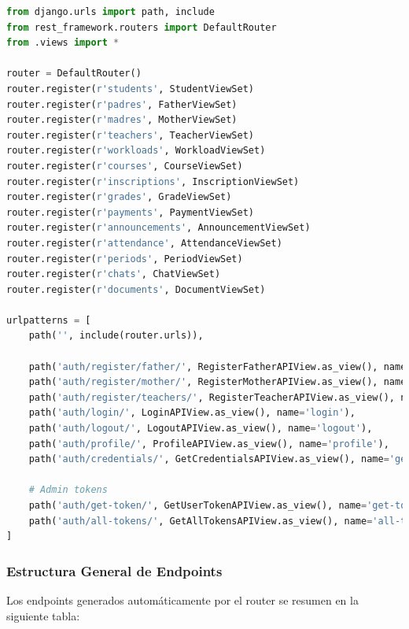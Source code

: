 \documentclass{article}
\begin{document}
\begin{lstlisting}[language=Python, caption={Archivo AppCuna/urls.py}]
from django.urls import path, include
from rest_framework.routers import DefaultRouter
from .views import *

router = DefaultRouter()
router.register(r'students', StudentViewSet)
router.register(r'padres', FatherViewSet)
router.register(r'madres', MotherViewSet)
router.register(r'teachers', TeacherViewSet)
router.register(r'workloads', WorkloadViewSet)
router.register(r'courses', CourseViewSet)
router.register(r'inscriptions', InscriptionViewSet)
router.register(r'grades', GradeViewSet)
router.register(r'payments', PaymentViewSet)
router.register(r'announcements', AnnouncementViewSet)
router.register(r'attendance', AttendanceViewSet)
router.register(r'periods', PeriodViewSet)
router.register(r'chats', ChatViewSet)
router.register(r'documents', DocumentViewSet)

urlpatterns = [
    path('', include(router.urls)),

    path('auth/register/father/', RegisterFatherAPIView.as_view(), name='register-father'),
    path('auth/register/mother/', RegisterMotherAPIView.as_view(), name='register-mother'),
    path('auth/register/teachers/', RegisterTeacherAPIView.as_view(), name='register-teacher'),
    path('auth/login/', LoginAPIView.as_view(), name='login'),
    path('auth/logout/', LogoutAPIView.as_view(), name='logout'),
    path('auth/profile/', ProfileAPIView.as_view(), name='profile'),
    path('auth/credentials/', GetCredentialsAPIView.as_view(), name='get-credentials'),

    # Admin tokens
    path('auth/get-token/', GetUserTokenAPIView.as_view(), name='get-token'),
    path('auth/all-tokens/', GetAllTokensAPIView.as_view(), name='all-tokens'),
]
\end{lstlisting}

\subsubsection*{Estructura General de Endpoints}

Los endpoints generados automáticamente por el router se resumen en la siguiente tabla:
\end{document}
